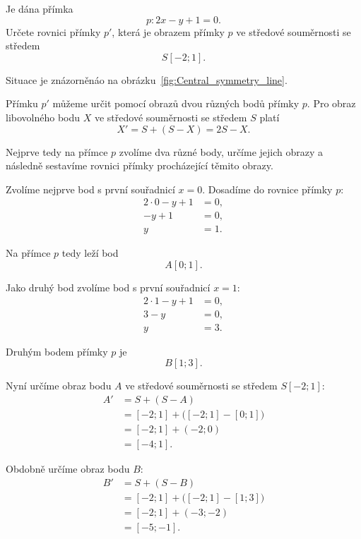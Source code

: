 \begin{example}\label{exa:Central_symmetry_line}
    Je dána přímka
    \[
        p:2x-y+1=0.
    \]
    Určete rovnici přímky $p'$, která je obrazem přímky $p$ ve
    středové souměrnosti se středem
    \[
        S[-2;1].
    \]

    Situace je znázorněnáo na obrázku~\ref{fig:Central_symmetry_line}.
    
    Přímku $p'$ můžeme určit pomocí obrazů dvou různých bodů přímky
    $p$. Pro obraz libovolného bodu $X$ ve středové souměrnosti se
    středem $S$ platí
    \[
        X'=S+(S-X)=2S-X.
    \]

    Nejprve tedy na přímce $p$ zvolíme dva různé body, určíme jejich
    obrazy a následně sestavíme rovnici přímky procházející těmito
    obrazy.

    Zvolíme nejprve bod s první souřadnicí $x=0$. Dosadíme do rovnice
    přímky $p$:
    \begin{align*}
        2\cdot0-y+1&=0,\\
        -y+1&=0,\\
        y&=1.
    \end{align*}

    Na přímce $p$ tedy leží bod
    \[
        A[0;1].
    \]

    Jako druhý bod zvolíme bod s první souřadnicí $x=1$:
    \begin{align*}
        2\cdot1-y+1&=0,\\
        3-y&=0,\\
        y&=3.
    \end{align*}

    Druhým bodem přímky $p$ je
    \[
        B[1;3].
    \]

    Nyní určíme obraz bodu $A$ ve středové souměrnosti se středem
    $S[-2;1]$:
    \begin{align*}
        A'
        &=
        S+(S-A)\\
        &=
        [-2;1]+\bigl([-2;1]-[0;1]\bigr)\\
        &=
        [-2;1]+(-2;0)\\
        &=
        [-4;1].
    \end{align*}

    Obdobně určíme obraz bodu $B$:
    \begin{align*}
        B'
        &=
        S+(S-B)\\
        &=
        [-2;1]+\bigl([-2;1]-[1;3]\bigr)\\
        &=
        [-2;1]+(-3;-2)\\
        &=
        [-5;-1].
    \end{align*}


\end{example}
